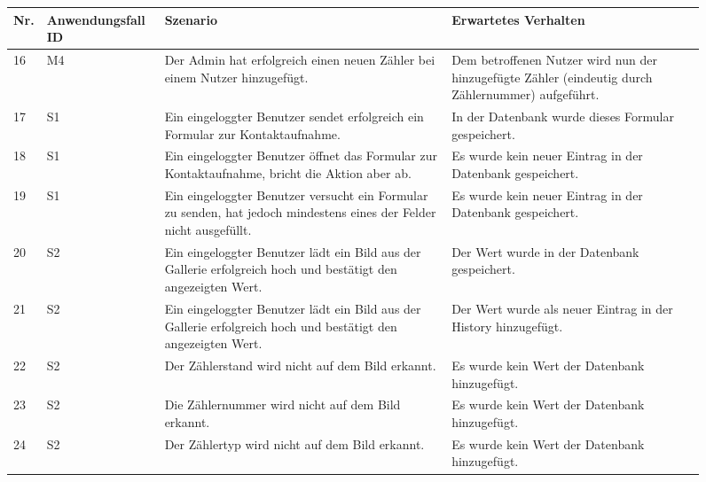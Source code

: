 	\begin{figure}[!h]
		\begin{center}
			\begin{tabularx}{\textwidth}{ p{} | p{} | p{} | X }
				\textbf{Nr.} & \textbf{Anwendungsfall ID} & \textbf{Szenario} & \textbf{Erwartetes Verhalten} \\ \hline
				16 & M4 & Der Admin hat erfolgreich einen neuen Zähler bei einem Nutzer hinzugefügt.   & Dem betroffenen Nutzer wird nun der hinzugefügte Zähler (eindeutig durch Zählernummer) aufgeführt. \\ \hline
				17 & S1 & Ein eingeloggter Benutzer sendet erfolgreich ein Formular zur Kontaktaufnahme. & In der Datenbank wurde dieses Formular gespeichert. \\ \hline
                			18 & S1 & Ein eingeloggter Benutzer öffnet das Formular zur Kontaktaufnahme, bricht die Aktion aber ab. & Es wurde kein neuer Eintrag in der Datenbank gespeichert. \\ \hline
                			19 & S1 & Ein eingeloggter Benutzer versucht ein Formular zu senden, hat jedoch mindestens eines der Felder nicht ausgefüllt. &  Es wurde kein neuer Eintrag in der Datenbank gespeichert. \\ \hline
                			20 & S2 & Ein eingeloggter Benutzer lädt ein Bild aus der Gallerie erfolgreich hoch und bestätigt den angezeigten Wert. & Der Wert wurde in der Datenbank gespeichert.    \\ \hline
                			21 & S2 & Ein eingeloggter Benutzer lädt ein Bild aus der Gallerie erfolgreich hoch und bestätigt den angezeigten Wert. & Der Wert wurde als neuer Eintrag in der History hinzugefügt.    \\ \hline
                			22 & S2 & Der Zählerstand wird nicht auf dem Bild erkannt. & Es wurde kein Wert der Datenbank hinzugefügt. \\ \hline
                			23 & S2 & Die Zählernummer wird nicht auf dem Bild erkannt. & Es wurde kein Wert der Datenbank hinzugefügt. \\ \hline
                			24 & S2 & Der Zählertyp wird nicht auf dem Bild erkannt. & Es wurde kein Wert der Datenbank hinzugefügt. \\ \hline
			\end{tabularx}	
		\end{center}
		\end{figure}
                			
